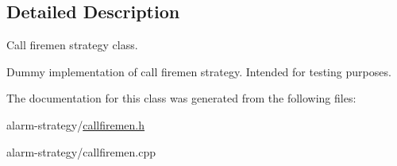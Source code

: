 \subsection{Detailed Description}
Call firemen strategy class. 

Dummy implementation of call firemen strategy. Intended for testing purposes. 

The documentation for this class was generated from the following files\+:\begin{DoxyCompactItemize}
\item 
alarm-\/strategy/\hyperlink{callfiremen_8h}{callfiremen.\+h}\item 
alarm-\/strategy/callfiremen.\+cpp\end{DoxyCompactItemize}
